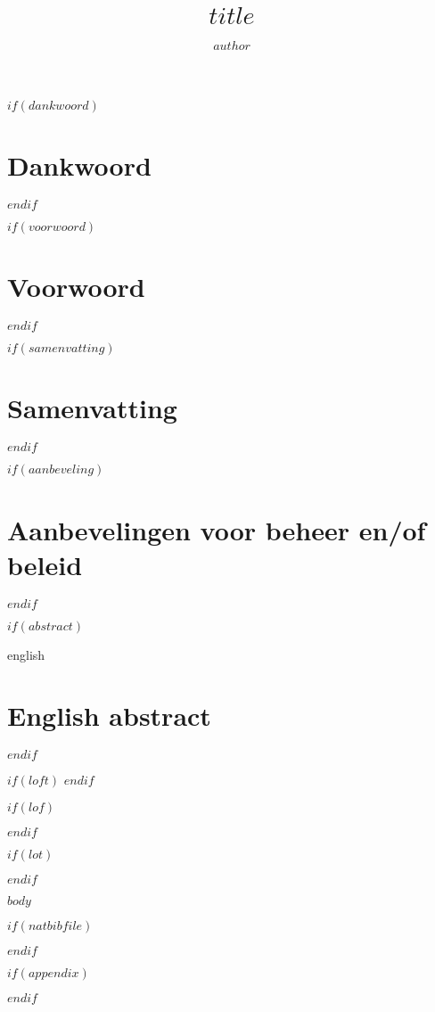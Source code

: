 \documentclass[11pt, twoside]{extreport}
\title{$title$}
\author{$author$}
\begin{document}
\maketitle
{}

$if(dankwoord)$
\chapter*{Dankwoord}


$endif$

$if(voorwoord)$
\chapter*{Voorwoord}


$endif$

$if(samenvatting)$
\chapter*{Samenvatting}


$endif$

$if(aanbeveling)$
\chapter*{Aanbevelingen voor beheer en/of beleid}


$endif$

$if(abstract)$
\begin{otherlanguage*}{english}
\chapter*{English abstract}


\end{otherlanguage*}
$endif$

\clearpage

\tableofcontents
{}

$if(loft)$
\clearpage
$endif$

$if(lof)$
\listoffigures
{}
$endif$

$if(lot)$
\listoftables
{}
$endif$

\newpage
{}

$body$

$if(natbibfile)$


$endif$

$if(appendix)$
\appendix

$endif$
\end{document}
